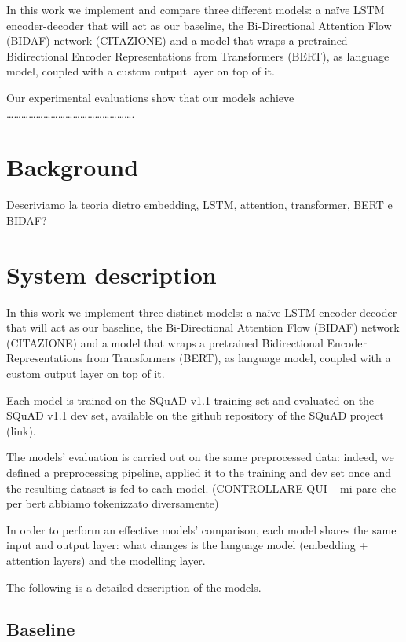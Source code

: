 \documentclass[a4paper,10pt]{report}
\begin{document}
In this work we implement and compare three different models: a naïve LSTM encoder-decoder that will act as our baseline, the Bi-Directional Attention Flow (BIDAF) network (CITAZIONE) and a model that wraps a pretrained Bidirectional Encoder Representations from Transformers (BERT), as language model, coupled with a custom output layer on top of it.

Our experimental evaluations show that our models achieve …………………………………………….

\chapter{Background}\label{chap:background}

Descriviamo la teoria dietro embedding, LSTM, attention, transformer, BERT e BIDAF?

\chapter{System description}\label{chap:system-description}

In this work we implement three distinct models: a naïve LSTM encoder-decoder that will act as our baseline, the Bi-Directional Attention Flow (BIDAF) network (CITAZIONE) and a model that wraps a pretrained Bidirectional Encoder Representations from Transformers (BERT), as language model, coupled with a custom output layer on top of it.

Each model is trained on the SQuAD v1.1 training set and evaluated on the SQuAD v1.1 dev set, available on the github repository of the SQuAD project (link).

The models’ evaluation is carried out on the same preprocessed data: indeed, we defined a preprocessing pipeline, applied it to the training and dev set once and the resulting dataset is fed to each model. (CONTROLLARE QUI – mi pare che per bert abbiamo tokenizzato diversamente)

In order to perform an effective models’ comparison, each model shares the same input and output layer: what changes is the language model (embedding + attention layers) and the modelling layer.

The following is a detailed description of the models.

\section{Baseline}\label{sec:baseline}
\end{document}
